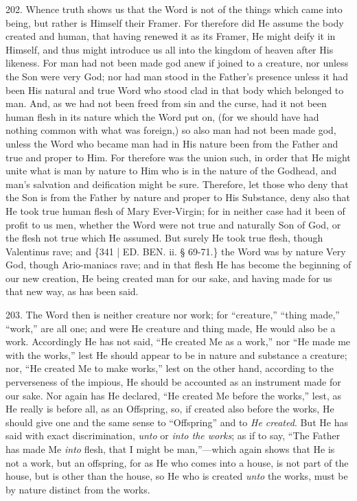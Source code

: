 202. Whence truth shows us
that the Word is not of the things which came into being, but rather
is Himself their Framer. For therefore did He assume the body created
and human, that having renewed it as its Framer, He might deify it in
Himself, and thus might introduce us all into the kingdom of heaven
after His likeness. For man had not been made god anew if joined to a
creature, nor unless the Son were very God; nor had man stood in the
Father's presence unless it had been His natural and true Word who
stood clad in that body which belonged to man. And, as we had not been
freed from sin and the curse, had it not been human flesh in its
nature which the Word put on, (for we should have had nothing common
with what was foreign,) so also man had not been made god, unless the
Word who became man had in His nature been from the Father and true
and proper to Him. For therefore was the union such, in order that He
might unite what is man by nature to Him who is in the nature of the
Godhead, and man's salvation and deification might be sure. Therefore,
let those who deny that the Son is from the Father by nature and
proper to His Substance, deny also that He took true human flesh of
Mary Ever-Virgin; for in neither case had it been of profit to us men,
whether the Word were not true and naturally Son of God, or the flesh
not true which He assumed. But surely He took true flesh, though
Valentinus rave; and \{341 | ED.
BEN. ii. § 69-71.\} the Word was by nature Very
God, though Ario-maniacs rave; and in that flesh He has become the
beginning of our new creation, He being created man for our sake, and
having made for us that new way, as has been said.

203. The Word then is neither
creature nor work; for ``creature,'' ``thing made,'' ``work,'' are all one;
and were He creature and thing made, He would also be a work.
Accordingly He has not said, ``He created Me as a work,'' nor ``He made
me with the works,'' lest He should appear to be in nature and
substance a creature; nor, ``He created Me to make works,'' lest on the
other hand, according to the perverseness of the impious, He should be
accounted as an instrument made for our sake. Nor again has He
declared, ``He created Me before the works,'' lest, as He really is
before all, as an Offspring, so, if created also before the works, He
should give one and the same sense to ``Offspring'' and to \emph{He created}.
But He has said with exact discrimination, \emph{unto} or \emph{into the
works}; as if to say, ``The Father has made Me \emph{into} flesh,
that I might be man,''—which again shows that He is not a work, but
an offspring, for as He who comes into a house, is not part of the
house, but is other than the house, so He who is created \emph{unto}
the works, must be by nature distinct from the works.

